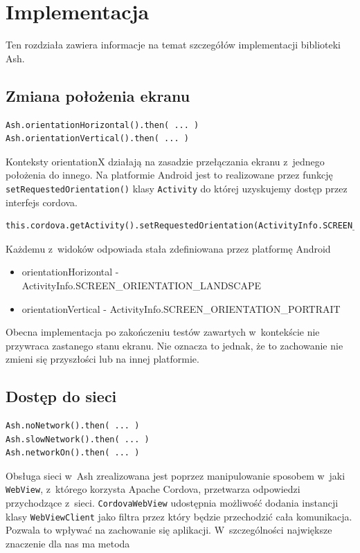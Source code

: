 \documentclass[brudnopis]{xmgr}
\begin{document}
\chapter{Implementacja}

Ten rozdziała zawiera informacje na temat szczegółów implementacji biblioteki Ash.

\section{Zmiana położenia ekranu}

\begin{lstlisting}
Ash.orientationHorizontal().then( ... ) 
Ash.orientationVertical().then( ... ) 
\end{lstlisting}

Konteksty orientationX działają na zasadzie przełączania ekranu z~jednego położenia do innego. Na platformie Android jest to realizowane przez funkcję \texttt{setRequestedOrientation()} klasy \texttt{Activity} do której uzyskujemy dostęp przez interfejs cordova. 

\begin{lstlisting}
this.cordova.getActivity().setRequestedOrientation(ActivityInfo.SCREEN_ORIENTATION_LANDSCAPE);
\end{lstlisting}

Każdemu z~widoków odpowiada stała zdefiniowana przez platformę Android
\begin{itemize}
  \item orientationHorizontal - ActivityInfo.SCREEN\_ORIENTATION\_LANDSCAPE
  \item orientationVertical - ActivityInfo.SCREEN\_ORIENTATION\_PORTRAIT
\end{itemize}

Obecna implementacja po zakończeniu testów zawartych w~kontekście nie przywraca zastanego stanu ekranu. Nie oznacza to jednak, że to zachowanie nie zmieni się przyszłości lub na innej platformie.

\section{Dostęp do sieci}

\begin{lstlisting}
Ash.noNetwork().then( ... ) 
Ash.slowNetwork().then( ... ) 
Ash.networkOn().then( ... ) 
\end{lstlisting}

Obsługa sieci w~Ash zrealizowana jest poprzez manipulowanie sposobem w~jaki \texttt{WebView}, z~którego korzysta Apache Cordova, przetwarza odpowiedzi przychodzące z~sieci. \texttt{CordovaWebView} udostępnia możliwość dodania instancji klasy \texttt{WebViewClient} jako filtra przez który będzie przechodzić cała komunikacja. Pozwala to wpływać na zachowanie się aplikacji. W~szczególności największe znaczenie dla nas ma metoda
\end{document}
